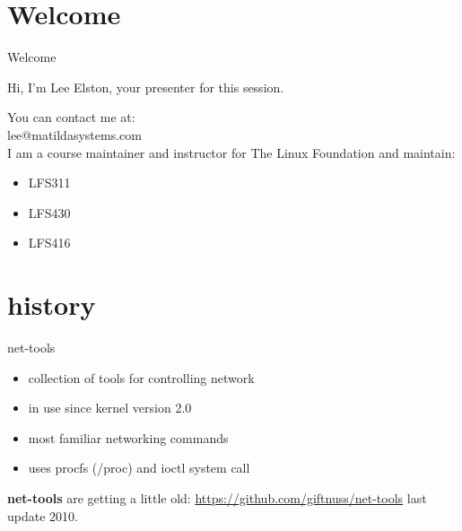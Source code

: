 \section{Welcome}

\begin{frame}
        {Welcome}

        Hi, I'm Lee Elston, your presenter for this session.

        You can contact me at: \\
        lee@matildasystems.com \\

        I am a course maintainer and instructor for The Linux Foundation
        and maintain: 

        \begin{itemize}

        \item LFS311
        \item LFS430
        \item LFS416
        
        \end{itemize}

\end{frame}

\cprotect\note{

        }



\section{history}

\begin{frame}
   {net-tools}
   \begin{itemize}
      	\item collection of tools for controlling network
	\item in use since kernel version 2.0
	\item most familiar networking commands 
	\item uses procfs (/proc) and ioctl system call 
   \end{itemize}

	\textbf{net-tools} are getting a little old: 
	\url{https://github.com/giftnuss/net-tools} last update 2010. 

\end{frame}

\cprotect\note{


}


